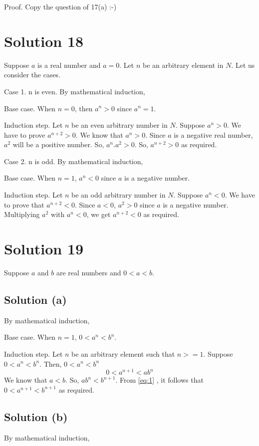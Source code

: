 \documentclass{article}
\begin{document}
Proof. Copy the question of 17(a) :-)

\section{Solution 18}
Suppose $a$ is a real number and $a = 0$. Let $n$ be an arbitrary
element in $N$. Let us consider the cases.

Case 1. n is even. By mathematical induction,

Base case. When $n = 0$, then $a^n > 0$ since $a^n = 1$.

Induction step. Let $n$ be an even arbitrary number in $N$. Suppose
$a^n > 0$. We have to prove $a^{n+2} > 0$. We know that $a^n > 0$.
Since $a$ is a negative real number, $a^2$ will be a positive number.
So, $a^n.a^2 > 0$. So, $a^{n+2} > 0$ as required.

Case 2. n is odd. By mathematical induction,

Base case. When $n=1$, $a^{n} < 0$ since $a$ is a negative number.

Induction step. Let $n$ be an odd arbitrary number in $N$. Suppose
$a^n < 0$. We have to prove that $a^{n+2} < 0$. Since $a < 0$, $a^2 >
0$ since $a$ is a negative number. Multiplying $a^2$ with $a^n < 0$,
we get $a^{n+2} < 0$ as required.

\section{Solution 19}
Suppose $a$ and $b$ are real numbers and $0 < a < b$.
\subsection{Solution (a)}
By mathematical induction,

Base case. When $n=1$, $0 < a^n < b^n$.

Induction step. Let $n$ be an arbitrary element such that $n>= 1$.
Suppose $0 < a^n < b^n$. Then,
$0 < a^n < b^n$ \\
\begin{equation}\label{eq:1}
  0 < a^{n+1} < ab^n
\end{equation}
We know that $a < b$. So, $ab^n < b^{n+1}$. From \ref{eq:1} , it follows
that $0 < a^{n+1} < b^{n+1}$ as required.

\subsection{Solution (b)}
By mathematical induction,
\end{document}
